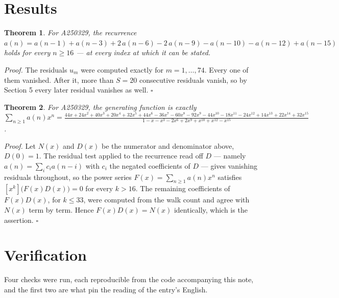 \documentclass[11pt]{article}
\newtheorem{theorem}{Theorem}
\theoremstyle{definition}
\begin{document}
\section{Results}

\begin{theorem} For A250329, the recurrence $a(n) = a(n-1) + a(n-3) + 2\,a(n-6) - 2\,a(n-9) - a(n-10) - a(n-12) + a(n-15)$ holds for every $n \ge 16$ --- at every index at which it can be stated.\end{theorem}

{\itshape Proof.} The residuals $u_m$ were computed exactly for $m = 1,\dots,74$. Every one of them vanished. After it, more than $S = 20$ consecutive residuals vanish, so by Section 5 every later residual vanishes as well. $\square$

\begin{theorem} For A250329, the generating function is exactly $\sum_{n\ge 1} a(n)x^n = \frac{44x + 24x^{2} + 40x^{3} + 20x^{4} + 32x^{5} + 44x^{6} - 36x^{7} - 60x^{8} - 92x^{9} - 44x^{10} - 18x^{11} - 24x^{12} + 14x^{13} + 22x^{14} + 32x^{15}}{1 - x - x^{3} - 2x^{6} + 2x^{9} + x^{10} + x^{12} - x^{15}}$.\end{theorem}

{\itshape Proof.} Let $N(x)$ and $D(x)$ be the numerator and denominator above, $D(0)=1$. The residual test applied to the recurrence read off $D$ --- namely $a(n) = \sum_i c_i a(n-i)$ with $c_i$ the negated coefficients of $D$ --- gives vanishing residuals throughout, so the power series $F(x)=\sum_{n\ge 1}a(n)x^n$ satisfies $[x^k]\bigl(F(x)D(x)\bigr) = 0$ for every $k > 16$. The remaining coefficients of $F(x)D(x)$, for $k \le 33$, were computed from the walk count and agree with $N(x)$ term by term. Hence $F(x)D(x) = N(x)$ identically, which is the assertion. $\square$

\section{Verification}

Four checks were run, each reproducible from the code accompanying this note, and the first two are what pin the reading of the entry's English.
\end{document}
